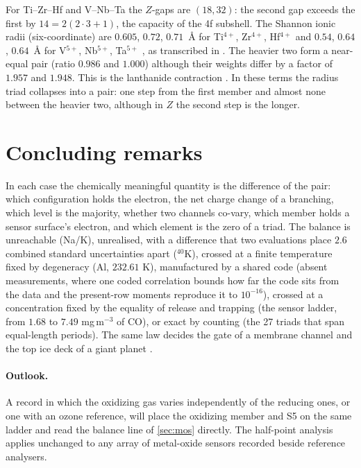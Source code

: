 \documentclass[11pt]{article}
\theoremstyle{definition}\newtheorem{definition}[theorem]{Definition}
\theoremstyle{remark}\newtheorem{remark}[theorem]{Remark}
\begin{document}
For Ti--Zr--Hf and V--Nb--Ta the $Z$-gaps are $(18,32)$: the second gap exceeds the first by $14=2(2\cdot3+1)$, the capacity of the 4f subshell. The Shannon ionic radii (six-coordinate) are $0.605$, $0.72$, $0.71$~\AA{} for Ti$^{4+}$, Zr$^{4+}$, Hf$^{4+}$ and $0.54$, $0.64$, $0.64$~\AA{} for V$^{5+}$, Nb$^{5+}$, Ta$^{5+}$ \cite{Shannon}, as transcribed in \cite{ShannonDB}. The heavier two form a near-equal pair (ratio $0.986$ and $1.000$) although their weights differ by a factor of $1.957$ and $1.948$. This is the lanthanide contraction \cite{GE}. In these terms the radius triad collapses into a pair: one step from the first member and almost none between the heavier two, although in $Z$ the second step is the longer.

\section{Concluding remarks}\label{sec:summary}
In each case the chemically meaningful quantity is the difference of the pair: which configuration holds the electron, the net charge change of a branching, which level is the majority, whether two channels co-vary, which member holds a sensor surface's electron, and which element is the zero of a triad. The balance is unreachable (Na/K), unrealised, with a difference that two evaluations place $2.6$ combined standard uncertainties apart (${}^{40}$K), crossed at a finite temperature fixed by degeneracy (Al, $232.61$ K), manufactured by a shared code (absent measurements, where one coded correlation bounds how far the code sits from the data and the present-row moments reproduce it to $10^{-16}$), crossed at a concentration fixed by the equality of release and trapping (the sensor ladder, from $1.68$ to $7.49$ mg\,m$^{-3}$ of CO), or exact by counting (the 27 triads that span equal-length periods). The same law decides the gate of a membrane channel \cite{Neuro} and the top ice deck of a giant planet \cite{Planet}.

\paragraph{Outlook.} A record in which the oxidizing gas varies independently of the reducing ones, or one with an ozone reference, will place the oxidizing member and S5 on the same ladder and read the balance line of \cref{sec:mos} directly. The half-point analysis applies unchanged to any array of metal-oxide sensors recorded beside reference analysers.
\end{document}
